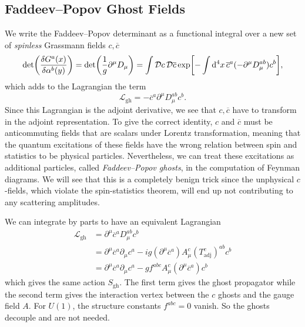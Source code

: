 
\subsection{Faddeev--Popov Ghost Fields}%
\label{sub:fadeev_popov_ghost_fields}

We write the Faddeev--Popov determinant as a functional integral over a new set of \emph{spinless} Grassmann fields $c, \overline{c}{}$
\begin{equation}
  \label{eq:22-1}
  \det(\frac{\delta G^{a}(x)}{\delta \alpha^{b}(y)}) = \det(\frac{1}{g} \partial^{\mu} D_{\mu}) = \int \mathop{\mathcal{D} c} \mathop{\mathcal{D} \overline{c}{}} \exp[-\int \dd[4]{x} \overline{c}{}^{a}(-\partial^{\mu} D_{\mu}^{ab}) c^{b}],
\end{equation}
which adds to the Lagrangian the term
\begin{equation}
  \mathscr{L}_{\text{gh}} = -\overline{c}{}^{a} \partial^{\mu} D_{\mu} ^{ab} c^{b}.
\end{equation}
Since this Lagrangian is the adjoint derivative, we see that $c, \overline{c}{}$ have to transform in the adjoint representation.
To give the correct identity, $c$ and $\overline{c}{}$ must be anticommuting fields that are scalars under Lorentz transformation, meaning that the quantum excitations of these fields have the wrong relation between spin and statistics to be physical particles.
Nevertheless, we can treat these excitations as additional particles, called \emph{Faddeev--Popov ghosts}, in the computation of Feynman diagrams.
We will see that this is a completely benign trick since the unphysical $c$-fields, which violate the spin-statistics theorem, will end up not contributing to any scattering amplitudes.

We can integrate by parts to have an equivalent Lagrangian
\begin{align}
  \mathscr{L}_{\text{gh}} &= \partial^{\mu} \overline{c}{}^{a} D^{ab}_{\mu} c^{b} \\
			  &= \partial^{\mu} \overline{c}{}^{a} \partial_{\mu} c^{a} - i g (\partial^{\mu} \overline{c}{}^{a}) A^{c}_{\mu} (T^{c} _{\text{adj}})^{ab} c^{b} \\
			  &= \partial^{\mu} \overline{c}{}^{a} \partial_{\mu} c^{a} - g f^{abc} A_{\mu} ^{c} (\partial^{\mu} \overline{c}{}^{a}) c^{b}
\end{align}
which gives the same action $S_{\text{gh}}$.
The first term gives the ghost propagator while the second term gives the interaction vertex between the $c$ ghosts and the gauge field $A$.
For $U(1)$, the structure constants $f^{abc} = 0$ vanish. So the ghosts decouple and are not needed.

